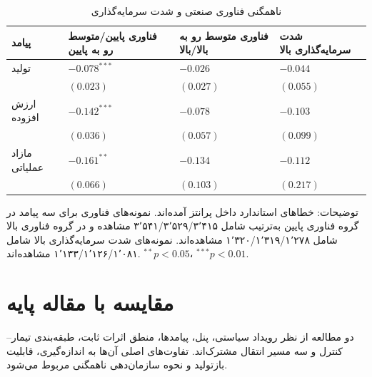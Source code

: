 \documentclass[11pt]{article}
\begin{document}
\begin{table}[htbp]
\centering
\caption{ناهمگنی فناوری صنعتی و شدت سرمایه‌گذاری}
\label{tab:heterogeneity}
\small
\begin{tabularx}{\textwidth}{lZZZ}
\toprule
پیامد & فناوری پایین/متوسط رو به پایین & فناوری متوسط رو به بالا/بالا & شدت سرمایه‌گذاری بالا \\
\midrule
تولید & $-0.078^{***}$ & $-0.026$ & $-0.044$ \\
 & $(0.023)$ & $(0.027)$ & $(0.055)$ \\
ارزش افزوده & $-0.142^{***}$ & $-0.078$ & $-0.103$ \\
 & $(0.036)$ & $(0.057)$ & $(0.099)$ \\
مازاد عملیاتی & $-0.161^{**}$ & $-0.134$ & $-0.112$ \\
 & $(0.066)$ & $(0.103)$ & $(0.217)$ \\
\bottomrule
\end{tabularx}
\begin{flushright}\footnotesize
توضیحات: خطاهای استاندارد داخل پرانتز آمده‌اند. نمونه‌های فناوری برای سه پیامد در گروه فناوری پایین به‌ترتیب شامل ۳٬۵۴۱/۳٬۵۲۹/۳٬۴۱۵ مشاهده و در گروه فناوری بالا شامل ۱٬۳۲۰/۱٬۳۱۹/۱٬۲۷۸ مشاهده‌اند. نمونه‌های شدت سرمایه‌گذاری بالا شامل ۱٬۱۳۳/۱٬۱۲۶/۱٬۰۸۱ مشاهده‌اند. $^{**}p<0.05$، $^{***}p<0.01$.
\end{flushright}
\end{table}

\section{مقایسه با مقاله پایه}

دو مطالعه از نظر رویداد سیاستی، پنل، پیامدها، منطق اثرات ثابت، طبقه‌بندی تیمار--کنترل و سه مسیر انتقال مشترک‌اند. تفاوت‌های اصلی آن‌ها به اندازه‌گیری، قابلیت بازتولید و نحوه سازمان‌دهی ناهمگنی مربوط می‌شود.
\end{document}
